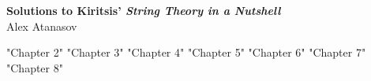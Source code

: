 \documentclass[11pt]{article}
\begin{document}
	\begin{center}
		\Large \textbf{Solutions to Kiritsis' \emph{String Theory in a Nutshell}}\\
		Alex Atanasov
	\end{center}
	
	{"Chapter 2"}
	\newpage 
	{"Chapter 3"}
	\newpage 
	{"Chapter 4"}
	\newpage 
	{"Chapter 5"}
	\newpage 
	{"Chapter 6"}
	\newpage 
	{"Chapter 7"}
	\newpage 
	{"Chapter 8"}
\end{document}
